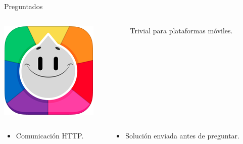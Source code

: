 \begin{frame}{Preguntados}
\begin{columns}
    \begin{column}{0.15\textwidth}
        \includegraphics[width=\textwidth,keepaspectratio]{imgs/preguntados_logo.png}
    \end{column}
    \begin{column}{0.85\textwidth}
        Trivial para plataformas móviles.
    \end{column}
\end{columns}

\vfill
\vspace{0.35cm}
\begin{columns}
    \begin{column}{0.5\textwidth}
    \begin{itemize}
        \item<3-> Comunicación HTTP.
    \end{itemize}
    \end{column}

    \begin{column}{0.5\textwidth}
    \begin{itemize}
        \item<4-> Solución enviada antes de preguntar.
    \end{itemize}
    \end{column}
\end{columns}




\end{frame}

